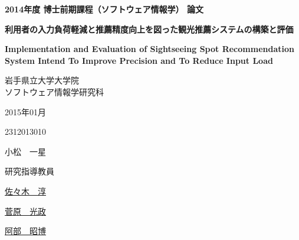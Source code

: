 \documentclass{jsarticle}
\begin{document}
\thispagestyle{empty}
\begin{center}
\Large
\textbf{2014年度 博士前期課程（ソフトウェア情報学） 論文}

\vspace*{23mm}
\Huge
\textbf{利用者の入力負荷軽減と推薦精度向上を図った観光推薦システムの構築と評価}

\vspace{5mm}

\LARGE
\textbf{Implementation and Evaluation of Sightseeing Spot Recommendation System Intend To Improve Precision and To Reduce Input Load}

\vspace{20mm}

\LARGE

岩手県立大学大学院 \\
ソフトウェア情報学研究科

\vspace{10mm}

2015年01月

\vspace{10mm}

2312013010

小松　一星

\vspace{18mm}

\begin{flushright}

\Large
研究指導教員\hspace{20mm}

\LARGE
\underline{\hspace{10mm}佐々木　淳\hspace{10mm}}

\underline{\hspace{10mm}菅原　光政\hspace{10mm}}

\underline{\hspace{10mm}阿部　昭博\hspace{10mm}}

% 
% 

\end{flushright}


\end{center}
\end{document}
